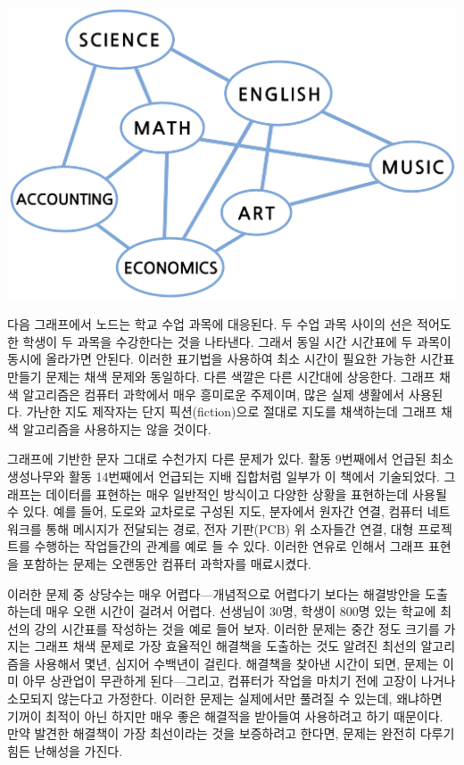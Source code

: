 \documentclass[]{article}
\begin{document}
\includegraphics{csunplugged/04-part/img/ch14-coloring/13-coloring-07-school-subject.png}

다음 그래프에서 노드는 학교 수업 과목에 대응된다. 두 수업 과목 사이의
선은 적어도 한 학생이 두 과목을 수강한다는 것을 나타낸다. 그래서 동일
시간 시간표에 두 과목이 동시에 올라가면 안된다. 이러한 표기법을 사용하여
최소 시간이 필요한 가능한 시간표 만들기 문제는 채색 문제와 동일하다.
다른 색깔은 다른 시간대에 상응한다. 그래프 채색 알고리즘은 컴퓨터
과학에서 매우 흥미로운 주제이며, 많은 실제 생활에서 사용된다. 가난한
지도 제작자는 단지 픽션(fiction)으로 절대로 지도를 채색하는데 그래프
채색 알고리즘을 사용하지는 않을 것이다.

그래프에 기반한 문자 그대로 수천가지 다른 문제가 있다. 활동 9번째에서
언급된 최소생성나무와 활동 14번째에서 언급되는 지배 집합처럼 일부가 이
책에서 기술되었다. 그래프는 데이터를 표현하는 매우 일반적인 방식이고
다양한 상황을 표현하는데 사용될 수 있다. 예를 들어, 도로와 교차로로
구성된 지도, 분자에서 원자간 연결, 컴퓨터 네트워크를 통해 메시지가
전달되는 경로, 전자 기판(PCB) 위 소자들간 연결, 대형 프로젝트를 수행하는
작업들간의 관계를 예로 들 수 있다. 이러한 연유로 인해서 그래프 표현을
포함하는 문제는 오랜동안 컴퓨터 과학자를 매료시켰다.

이러한 문제 중 상당수는 매우 어렵다---개념적으로 어렵다기 보다는
해결방안을 도출하는데 매우 오랜 시간이 걸려서 어렵다. 선생님이 30명,
학생이 800명 있는 학교에 최선의 강의 시간표를 작성하는 것을 예로 들어
보자. 이러한 문제는 중간 정도 크기를 가지는 그래프 채색 문제로 가장
효율적인 해결책을 도출하는 것도 알려진 최선의 알고리즘을 사용해서 몇년,
심지어 수백년이 걸린다. 해결책을 찾아낸 시간이 되면, 문제는 이미 아무
상관업이 무관하게 된다---그리고, 컴퓨터가 작업을 마치기 전에 고장이
나거나 소모되지 않는다고 가정한다. 이러한 문제는 실제에서만 풀려질 수
있는데, 왜냐하면 기꺼이 최적이 아닌 하지만 매우 좋은 해결적을 받아들여
사용하려고 하기 때문이다. 만약 발견한 해결책이 가장 최선이라는 것을
보증하려고 한다면, 문제는 완전히 다루기 힘든 난해성을 가진다.
\end{document}

